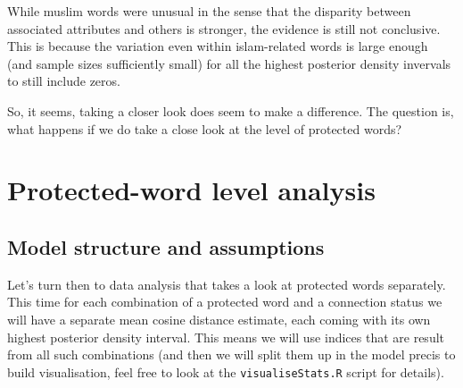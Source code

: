 \documentclass[
  12pt,
]{book}
\begin{document}
\normalsize

While muslim words were unusual in the sense that the disparity between associated attributes and others is stronger, the evidence is still not conclusive. This is because the variation even within islam-related words is large enough (and sample sizes sufficiently small) for all the highest posterior density invervals to still include zeros.

So, it seems, taking a closer look does seem to make a difference. The question is, what happens if we do take a close look at the level of protected words?

\hypertarget{protected-word-level-analysis}{%
\chapter{Protected-word level analysis}\label{protected-word-level-analysis}}

\hypertarget{model-structure-and-assumptions}{%
\section{Model structure and assumptions}\label{model-structure-and-assumptions}}

Let's turn then to data analysis that takes a look at protected words separately. This time for each combination of a protected word and a connection status we will have a separate mean cosine distance estimate, each coming with its own highest posterior density interval. This means we will use indices that are result from all such combinations (and then we will split them up in the model precis to build visualisation, feel free to look at the \texttt{visualiseStats.R} script for details).

\vspace{1mm}
\footnotesize
\end{document}
